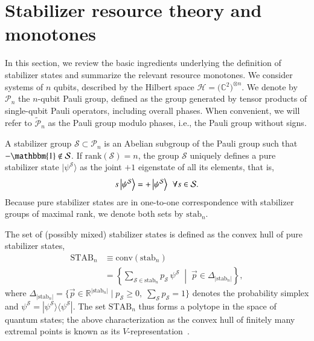 \documentclass[10pt,aps,pra,twocolumn,floatfix,nofootinbib,superscriptaddress,longbibliography]{revtex4-2}
\newcommand{\1}{\mathbbm{1}}
\newcommand{\iden}{\mathbbm{1}}
\begin{document}
\section{Stabilizer resource theory and monotones}
\label{sec:stab}

In this section, we review the basic ingredients underlying the definition of stabilizer states and summarize the relevant resource monotones. We consider systems of $n$ qubits, described by the Hilbert space $\mathcal H = (\mathbb{C}{^2)^{\otimes n}}$. We denote by $\mathcal P_n$ the $n$-qubit Pauli group, defined as the group generated by tensor products of single-qubit Pauli operators, including overall phases. When convenient, we will refer to $\tilde{\mathcal P}_n$ as the Pauli group modulo phases, i.e., the Pauli group without signs.

A stabilizer group $\mathcal S \subset \mathcal P_n$ is an Abelian subgroup of the Pauli group such that $-\iden \notin \mathcal S$. If $\mathrm{rank}(\mathcal S)=n$, the group $\mathcal S$ uniquely defines a pure stabilizer state $|\psi^{\mathcal S}\rangle$ as the joint $+1$ eigenstate of all its elements, that is,
\begin{equation}
    s\ket{\psi^\mathcal{S}} = +\ket{\psi^\mathcal{S}} \:\: \forall s\in\mathcal{S}.
\end{equation}
Because pure stabilizer states are in one-to-one correspondence with stabilizer groups of maximal rank, we denote both sets by $\mathrm{stab}_n$.

The set of (possibly mixed) stabilizer states is defined as the convex hull of pure stabilizer states,
\begin{align}
\mathrm{STAB}_n &\equiv \mathrm{conv}(\mathrm{stab}_n) \nonumber\\
&= \left\{\sum_{\mathcal S \in \mathrm{stab}_n} p_{\mathcal S}\,\psi^{\mathcal S} \;\middle|\; \vec p \in \Delta_{|\mathrm{stab}_n|}\right\},
\label{eq:stabpolytope}
\end{align}
where $\Delta_{|\mathrm{stab}_n|} = \{\vec p \in \mathbb R^{|\mathrm{stab}_n|} \mid p_{\mathcal S} \geq 0,\; \sum_{\mathcal S} p_{\mathcal S}=1\}$ denotes the probability simplex and $\psi^{\mathcal S} = |\psi^{\mathcal S}\rangle\!\langle\psi^{\mathcal S}|$. The set $\mathrm{STAB}_n$ thus forms a polytope in the space of quantum states; the above characterization as the convex hull of finitely many extremal points is known as its $V$-representation~\cite{ziegler1995lectures}.
\end{document}
